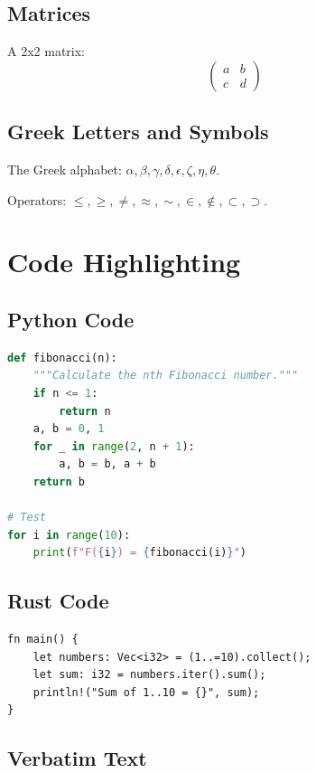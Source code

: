 \documentclass[12pt]{article}
\begin{document}
\subsection{Matrices}

A 2x2 matrix:
$$\begin{pmatrix} a & b \\ c & d \end{pmatrix}$$

\subsection{Greek Letters and Symbols}

The Greek alphabet: $\alpha, \beta, \gamma, \delta, \epsilon, \zeta, \eta, \theta$.

Operators: $\leq, \geq, \neq, \approx, \sim, \in, \notin, \subset, \supset$.

\section{Code Highlighting}
\label{sec:code}

\subsection{Python Code}

\begin{lstlisting}[language=Python]
def fibonacci(n):
    """Calculate the nth Fibonacci number."""
    if n <= 1:
        return n
    a, b = 0, 1
    for _ in range(2, n + 1):
        a, b = b, a + b
    return b

# Test
for i in range(10):
    print(f"F({i}) = {fibonacci(i)}")
\end{lstlisting}

\subsection{Rust Code}

\begin{verbatim}
fn main() {
    let numbers: Vec<i32> = (1..=10).collect();
    let sum: i32 = numbers.iter().sum();
    println!("Sum of 1..10 = {}", sum);
}
\end{verbatim}

\subsection{Verbatim Text}
\end{document}

